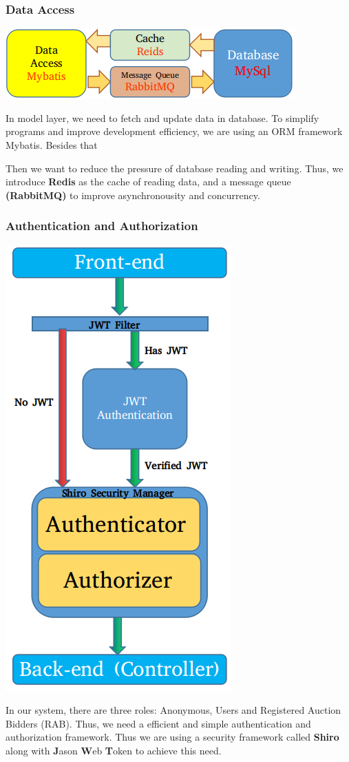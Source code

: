 \documentclass[12pt]{article}
\begin{document}
\subsubsection{Data Access}
\centerline{\includegraphics[scale = 0.5]{pic/g3.png}}
In model layer, we need to fetch and update data in database. To simplify programs and 
improve development efficiency, we are using an ORM framework Mybatis. Besides that

Then we want to reduce the pressure of database reading and writing. Thus, we 
introduce \textbf{Redis} as the cache of reading data, and a message queue \textbf{(RabbitMQ)}
to improve asynchronousity and concurrency.

\subsubsection{Authentication and Authorization}
\centerline{\includegraphics[scale = 0.44]{pic/g4.png}}
In our system, there are three roles: Anonymous, Users and Registered Auction Bidders (RAB). Thus, we
need a efficient and simple authentication and authorization framework. Thus we are using  a security framework called
\textbf{Shiro} along with \textbf{J}ason \textbf{W}eb \textbf{T}oken to achieve this need.
\end{document}
